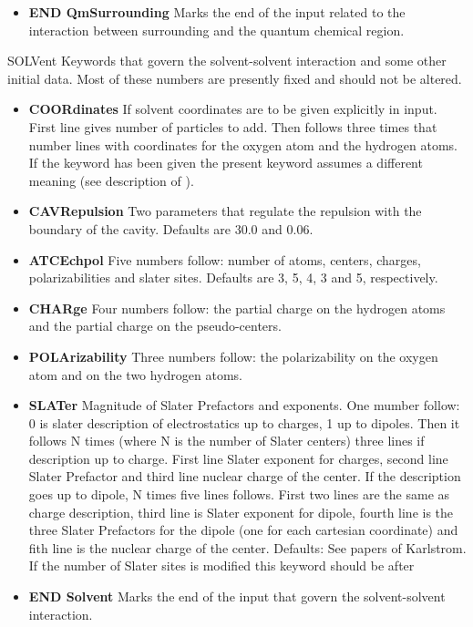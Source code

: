 \begin{keywordlist}
\begin{itemize}
\item {\bf END QmSurrounding}
Marks the end of the input related to the interaction between surrounding
and the quantum chemical region.
\end{itemize}
\item[SOLVent]
Keywords that govern the solvent-solvent interaction and some
other initial data. Most of these numbers are presently fixed
and should not be altered.
\begin{itemize}
\item {\bf COORdinates}
If solvent coordinates are to be given explicitly in input. First
line gives number of particles to add. Then follows three times
that number lines with coordinates for the oxygen atom and the
hydrogen atoms.
If the keyword  has been given the
present keyword assumes a different meaning (see description
of ).
\item {\bf CAVRepulsion}
Two parameters that regulate the repulsion with the boundary
of the cavity. Defaults are 30.0 and 0.06.
\item {\bf ATCEchpol}
Five numbers follow: number of atoms, centers, charges, polarizabilities and
slater sites. Defaults are 3, 5, 4, 3 and 5, respectively.
\item {\bf CHARge}
Four numbers follow: the partial charge on the hydrogen atoms
and the partial charge on the pseudo-centers.
\item {\bf POLArizability}
Three numbers follow: the polarizability on the oxygen atom
and on the two hydrogen atoms.
\item {\bf SLATer}
Magnitude of Slater Prefactors and exponents. One mumber follow: 0 is slater description of electrostatics up to charges, 1 up to dipoles.
Then it follows N times (where N is the number of Slater centers) three lines if description up to charge. First line Slater exponent
for charges, second line Slater Prefactor and third line nuclear charge of the center. If the description goes up to dipole, N times
five lines follows. First two lines are the same as charge description, third line is Slater exponent for dipole, fourth line is the
three Slater Prefactors for the dipole (one for each cartesian coordinate) and fith line is the nuclear charge of the center. Defaults: See papers of Karlstrom. If the number of Slater sites is modified this keyword should be after 
\item {\bf END Solvent}
Marks the end of the input that govern the solvent-solvent interaction.
\end{itemize}

\end{keywordlist}
